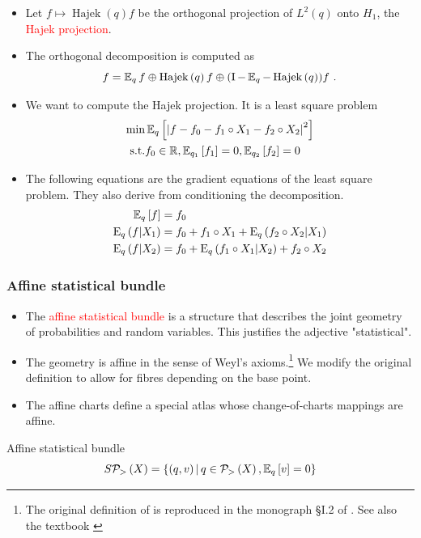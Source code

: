 \documentclass[xcolor=svgnames]{beamer}
\DeclareMathOperator{\Hajek}{Hajek}
\newcommand{\hajekof}[1]{\Hajek\left(#1\right)}
\newcommand{\rosso}[1]{\textcolor{red}{#1}}
\newcommand{\opensimplexon}[1]{\mathcal P_>\left(#1\right)}
\renewcommand{\emph}{\rosso}
\begin{document}
\begin{frame}
\begin{itemize}
    \item Let $f \mapsto \hajekof q f$ be the orthogonal projection of $L^2(q)$ onto $H_1$, the \emph{Hajek projection}.
    \item The orthogonal decomposition is computed as
    \begin{equation*}
        f = \Expectation_q f \oplus \hajekof q f \oplus (\operatorname I  - 
 \Expectation_q - \hajekof q) f \ .
    \end{equation*}
    \item We want to compute the Hajek projection. It is a least square problem
    \begin{align*}
    \min& \operatorname{\mathbb E}_{q}\left[\left\vert f - f_0 - f_1\circ X_1 - f_2\circ X_2\right\vert^2\right] \\    
    \text{s.t.}& f_0 \in \mathbb{R}, \operatorname{\mathbb E}_{q_1}\left[f_1\right] = 0, \operatorname{\mathbb E}_{q_2}\left[f_2\right] = 0
    \end{align*}
    \item The following equations are the gradient equations of the least square problem. They also derive from conditioning the decomposition.
    \begin{align*}
        \operatorname{\mathbb E}_{q}\left[f\right] &= f_0 \\
        \operatorname{E}_{q}\left(f \middle| X_1\right) &= f_0 + f_1\circ X_1 + \operatorname{E}_{q}\left(f_2 \circ X_2 \middle| X_1\right) \\ 
            \operatorname{E}_{q}\left(f \middle| X_2\right) &= f_0 + \operatorname{E}_{q}\left(f_1 \circ X_1 \middle| X_2\right) + f_2\circ X_2
        \end{align*}
\end{itemize}

\end{frame}

\begin{frame}[plain]\small\frametitle{Affine statistical bundle}
\begin{itemize}
    \item The \emph{affine statistical bundle} is a structure that describes the joint geometry of probabilities and random variables. This justifies the adjective "statistical".
    \item The geometry is affine in the sense of Weyl's axioms.\footnote{\tiny The original definition of  is reproduced in the monograph \S I.2 of . See also the textbook \cite{berger:1994}}
    We modify the original definition to allow for fibres depending on the base point.
\item The affine charts define a special atlas whose change-of-charts mappings are affine.
\end{itemize} 

\begin{block}{Affine statistical bundle}
    \begin{equation*}
        S\opensimplexon X = \setof{(q,v)}{q \in \opensimplexon X, \expectat q v =0}
    \end{equation*}
\end{block}
\end{frame}
\end{document}
